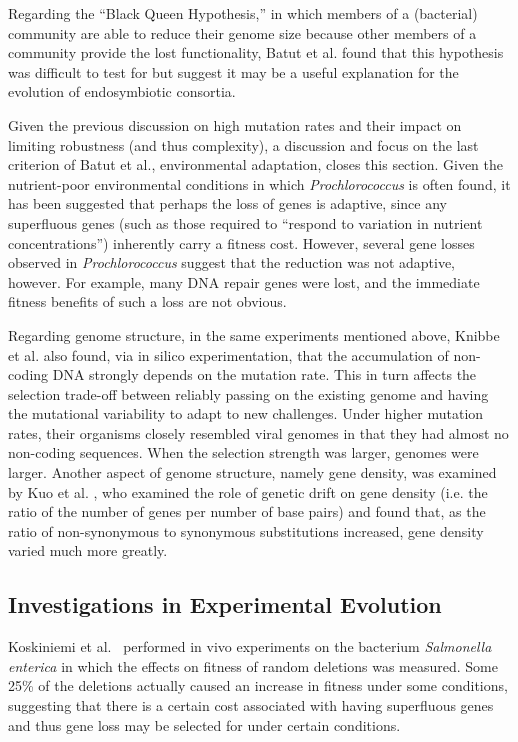 Regarding the ``Black Queen Hypothesis,'' in which members of a (bacterial) community are able to reduce their genome size because other members of a community provide the lost functionality, Batut et al. found that this hypothesis was difficult to test for but suggest it may be a useful explanation for the evolution of endosymbiotic consortia.  

Given the previous discussion on high mutation rates and their impact on limiting robustness (and thus complexity), a discussion and focus on the last criterion of Batut et al., environmental adaptation, closes this section. Given the nutrient-poor environmental conditions in which \textit{Prochlorococcus} is often found, it has been suggested that perhaps the loss of genes is adaptive, since any superfluous genes (such as those required to ``respond to variation in nutrient concentrations'') inherently carry a fitness cost. However, several gene losses observed in \textit{Prochlorococcus} suggest that the reduction was not adaptive, however. For example, many DNA repair genes were lost, and the immediate fitness benefits of such a loss are not obvious. 

Regarding genome structure, in the same experiments mentioned above, Knibbe et al.\cite{Knibbe2007} also found, via in silico experimentation, that the accumulation of non-coding DNA strongly depends on the mutation rate. This in turn affects the selection trade-off between reliably passing on the existing genome and having the mutational variability to adapt to new challenges.  Under higher mutation rates, their organisms closely resembled viral genomes in that they had almost no non-coding sequences. When the selection strength was larger, genomes were larger.  Another aspect of genome structure, namely gene density, was examined by Kuo et al. \cite{kuo2009consequences}, who examined the role of genetic drift on gene density (i.e. the ratio of the number of genes per number of base pairs) and found that, as the ratio of non-synonymous to synonymous substitutions increased, gene density varied much more greatly.
\subsection{Investigations in Experimental Evolution}

Koskiniemi et al.~\cite{koskiniemi2012} performed in vivo experiments on the bacterium \textit{Salmonella enterica} in which the effects on fitness of random deletions was measured. Some 25\% of the deletions actually caused an increase in fitness under some conditions, suggesting that there is a certain cost associated with having superfluous genes and thus gene loss may be selected for under certain conditions.

